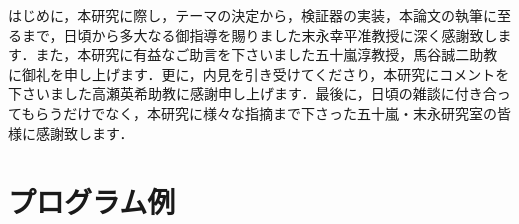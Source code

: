 \documentclass[master]{kuisthesis}
\begin{document}
\acknowledgments

はじめに，本研究に際し，テーマの決定から，検証器の実装，本論文の執筆に至
るまで，日頃から多大なる御指導を賜りました末永幸平准教授に深く感謝致しま
す．また，本研究に有益なご助言を下さいました五十嵐淳教授，馬谷誠二助教
に御礼を申し上げます．更に，内見を引き受けてくださり，本研究にコメントを
下さいました高瀬英希助教に感謝申し上げます．最後に，日頃の雑談に付き合っ
てもらうだけでなく，本研究に様々な指摘まで下さった五十嵐・末永研究室の皆
様に感謝致します．






\appendix
\section{プログラム例}

\end{document}
